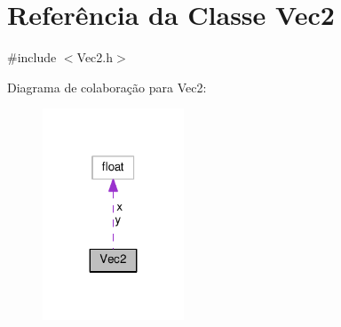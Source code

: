 \hypertarget{classVec2}{\section{Referência da Classe Vec2}
\label{classVec2}
}


{\ttfamily \#include $<$Vec2.\+h$>$}



Diagrama de colaboração para Vec2\+:
\nopagebreak
\begin{figure}[H]
\begin{center}
\leavevmode
\includegraphics[width=119pt]{classVec2__coll__graph}
\end{center}
\end{figure}
